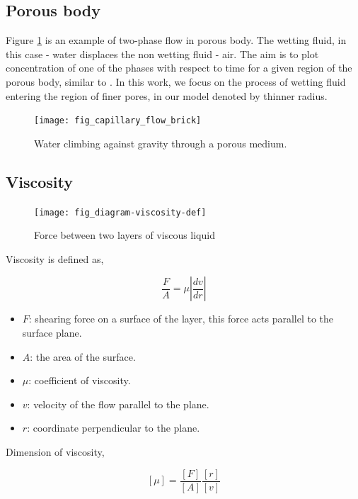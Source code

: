 \subsection{Porous body}
	Figure \ref{fig_capillary_flow_brick} is an example of two-phase flow in porous body. The wetting fluid, in this case - water displaces the non wetting fluid - air. The aim is to plot concentration of one of the phases with respect to time for a given region of the porous body, similar to \cite{fatt1956network}. In this work, we focus on the process of wetting fluid entering the region of finer pores, in our model denoted by thinner radius.
	
	\begin{figure}[H]
		\texttt{[image: fig\_capillary\_flow\_brick]}
		\caption{Water climbing against gravity through a porous medium. \cite{wiki:Capillary_action}}
		\label{fig_capillary_flow_brick}
	\end{figure}
	 


\subsection{Viscosity}
	\begin{figure}[H]
		\texttt{[image: fig\_diagram-viscosity-def]}
		\caption{Force between two layers of viscous liquid}
		\label{fig_diagram-viscosity-def}
	\end{figure}
	
	Viscosity is defined as,
	
	\begin{equation} \label{eq:def-viscosity}
		\frac{F}{A} = \mu \left| \frac{dv}{dr} \right|
	\end{equation}
	
	\begin{itemize}
		\item $F$: shearing force on a surface of the layer, this force acts parallel to the surface plane.
		\item $A$: the area of the surface.
		\item $\mu$: coefficient of viscosity.
		\item $v$: velocity of the flow parallel to the plane.
		\item $r$: coordinate perpendicular to the plane.
	\end{itemize}
	
	Dimension of viscosity,
	
	\[ [\mu] = \frac{[F]}{[A]} \frac{[r]}{[v]} \]
	
